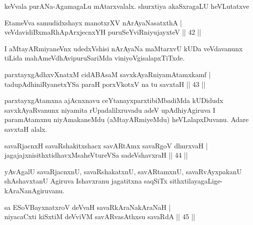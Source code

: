 \begin{artha}
keVvala purANa-AgamagaLu mAtarxvalalx. shurxtiya akaSxragaLU heVLutatxve
\end{artha}

\begin{shl}
\footnotemark[4]{}EtameVva samudidxshayx manotxrXV nArAyaNasatxthA |\\
veVdavidiBxmaRhApArxjecnxYH puruSeYviRniyujayxteV \hfill || 42 ||
\end{shl}

\begin{artha}
I aMtayARmiyaneVnx udedxVshisi nArAyaNa maMtarxvU kUDa veVda\-vanunx tiLida mahAmeVdhAvipuruSariMda viniyoVgisalapxTiTxde.
\end{artha}

\begin{shl}
parxtayxgAdhxvXnatxM cidABAsaM savxkAyaRniyamAtamxkamf |\\
tadupAdhiniRyanetxYSa paraH porxVkotxV na tu savxtaH \hfill || 43 ||
\end{shl}

\begin{artha}%
parxtayxgAtamxna ajAcnxnavu ceYtanayxparxtibiMbadiMda kUDidudx savxkAyaRvanunx niyamita rUpadalilxruvadu adeV upAdhiyAgiruva I paramAtamxnu niyAmakaneMdu (aMtayARmiyeMdu) heVLalapxDuvanu. Adare savxtaH alalx.
\end{artha}

\begin{shl}
savaRjacnxH savaRshakitxshacx savARtAmx savaRgoV dhurxvaH |\\
jagajajxnisithxtidhavxMsaheVtureVSa sadeVshavxraH \hfill || 44 ||
\end{shl}

\begin{artha}
yAvAgalU savaRjacnxnU, savaRshakatxnU, savARtamxnU, savaRvAyxpakanU shAshavxtanU Agiruva Ishavxranu jagatitxna saqSiTx sithxtilayagaLige-kAraNanAgiruvanu.
\end{artha}


\begin{shl}
sa ESoV\s BayxnatxroV deVvaH savaRkAraNakAraNaH |\\
niyacaCxti kiSxtiM deVviVM savARvasAthxsu savaRdA \hfill || 45 ||
\end{shl}

